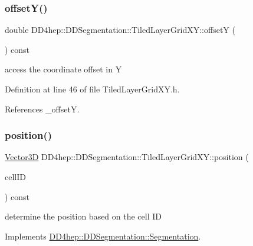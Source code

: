 \subsubsection{\texorpdfstring{offset\+Y()}{offsetY()}}
{\footnotesize\ttfamily double D\+D4hep\+::\+D\+D\+Segmentation\+::\+Tiled\+Layer\+Grid\+X\+Y\+::offsetY (\begin{DoxyParamCaption}{ }\end{DoxyParamCaption}) const\hspace{0.3cm}{\ttfamily [inline]}}



access the coordinate offset in Y 



Definition at line 46 of file Tiled\+Layer\+Grid\+X\+Y.\+h.



References \+\_\+offsetY.

\hypertarget{class_d_d4hep_1_1_d_d_segmentation_1_1_tiled_layer_grid_x_y_af1018adc15e286afdc0abfa69a78f462}{}\label{class_d_d4hep_1_1_d_d_segmentation_1_1_tiled_layer_grid_x_y_af1018adc15e286afdc0abfa69a78f462} 
\subsubsection{\texorpdfstring{position()}{position()}}
{\footnotesize\ttfamily \hyperlink{struct_d_d4hep_1_1_d_d_segmentation_1_1_vector3_d}{Vector3D} D\+D4hep\+::\+D\+D\+Segmentation\+::\+Tiled\+Layer\+Grid\+X\+Y\+::position (\begin{DoxyParamCaption}\item[{const \hyperlink{namespace_d_d4hep_1_1_d_d_segmentation_ac7af071d85cb48820914434a07e21ba1}{Cell\+ID} \&}]{cell\+ID }\end{DoxyParamCaption}) const\hspace{0.3cm}{\ttfamily [virtual]}}



determine the position based on the cell ID 



Implements \hyperlink{class_d_d4hep_1_1_d_d_segmentation_1_1_segmentation_a594fe6d78667415855858d083b64acad}{D\+D4hep\+::\+D\+D\+Segmentation\+::\+Segmentation}.



